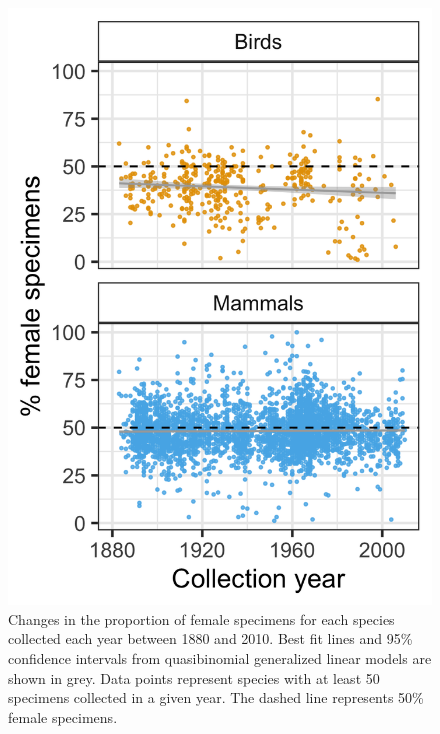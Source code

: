 \documentclass[a4paper, 12pt]{article}
\begin{document}
\begin{figure}
 \centering
  \includegraphics[width = \linewidth]{figures/years-all.png}
  \caption{Changes in the proportion of female specimens for each species collected each year between 1880 and 2010. 
  Best fit lines and 95\% confidence intervals from quasibinomial generalized linear models are shown in grey. 
  Data points represent species with at least 50 specimens collected in a given year. 
  The dashed line represents 50\% female specimens.
}
  \label{fig-time}
\end{figure}
\end{document}

